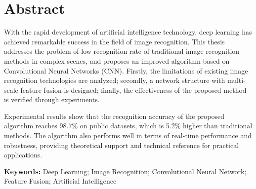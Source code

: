 \cleardoublepage %
\chapter*{Abstract}

With the rapid development of artificial intelligence technology, deep learning has achieved remarkable success in the field of image recognition. This thesis addresses the problem of low recognition rate of traditional image recognition methods in complex scenes, and proposes an improved algorithm based on Convolutional Neural Networks (CNN). Firstly, the limitations of existing image recognition technologies are analyzed; secondly, a network structure with multi-scale feature fusion is designed; finally, the effectiveness of the proposed method is verified through experiments.

Experimental results show that the recognition accuracy of the proposed algorithm reaches 98.7\% on public datasets, which is 5.2\% higher than traditional methods. The algorithm also performs well in terms of real-time performance and robustness, providing theoretical support and technical reference for practical applications.

\vspace{1em}

\textbf{Keywords:} Deep Learning; Image Recognition; Convolutional Neural Network; Feature Fusion; Artificial Intelligence
